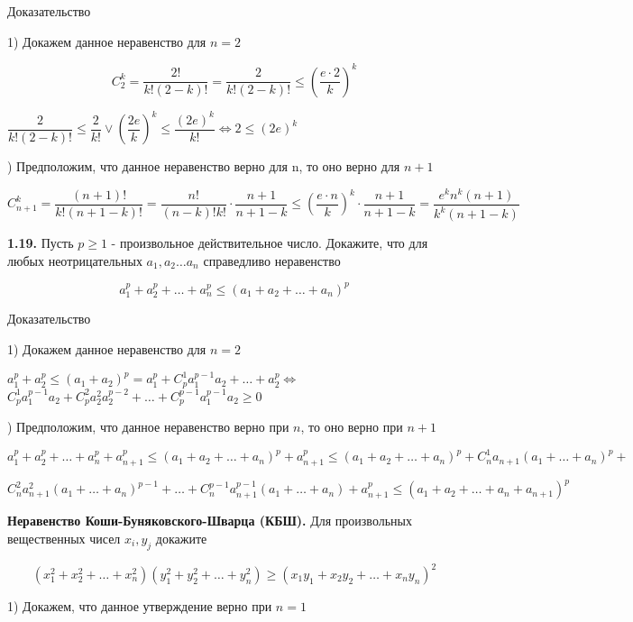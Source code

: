 \documentclass[12pt]{article}
\begin{document}
	\vspace{2mm}
	Доказательство
	
	1) Докажем данное неравенство для $n=2$\medskip
	
	\[
		C_2^k = \dfrac{2!}{k!(2-k)!} = \dfrac{2}{k!(2-k)!} \le \left(\dfrac{e\cdot2}{k}\right)^k 
	\]
	
	\qquad$\dfrac{2}{k!(2-k)!} \le \dfrac{2}{k!} \vee \left(\dfrac{2e}{k}\right)^k \le \dfrac{(2e)^k}{k!}$\quad$\Longleftrightarrow$\quad $2\le (2e)^k$ 
	
	) Предположим, что данное неравенство верно для n, то оно верно для $n+1$\medskip
	
	\qquad$
	C_{n+1}^k = \dfrac{(n+1)!}{k!(n+1-k)!} = \dfrac{n!}{(n-k)!k!}\cdot\dfrac{n+1}{n+1-k}\le \left(\dfrac{e\cdot n}{k}\right)^k\cdot\dfrac{n+1}{n+1-k} = \dfrac{e^k n^k(n+1)}{k^k(n+1-k)}
	$
	
	\medskip
	{\bf1.19.} \textasteriskcentered\hspace{1mm} Пусть $p\ge1$ - произвольное действительное число. Докажите, что для любых неотрицательных $a_1,a_2\dots a_n$ справедливо неравенство
	
	\[
		a_1^p+a_2^p+\dots+a_n^p \le (a_1+a_2+\dots+a_n)^p
	\]
	
	Доказательство 
	
	\medskip
	
	1) Докажем данное неравенство для $n=2$\medskip
	
	$a_1^p+a_2^p \le (a_1+a_2)^p = a_1^p+ C_p^1a_1^{p-1}a_2+\dots+ a_2^p$\quad$\Longleftrightarrow$\quad $C_p^1a_1^{p-1}a_2+C_p^2a_2^2a_2^{p-2}+\dots+C_p^{p-1}a_1^{p-1}a_2\ge 0$
	
	) Предположим, что данное неравенство верно при $n$, то оно верно при $n+1$\medskip
	
	$
		a_1^p+a_2^p+\dots+a_n^p + a_{n+1}^p \le (a_1+a_2+\dots+a_n)^p + a_{n+1}^p \le (a_1+a_2+\dots+a_n)^p+C_n^1 a_{n+1}(a_1+\dots+a_n)^p+
	$
	
	$
	C_n^2 a_{n+1}^2(a_1+\dots+a_n)^{p-1}+\dots+ C_n^{p-1}a_{n+1}^{p-1}(a_1+\dots+a_n)+a_{n+1}^p\le (a_1+a_2+\dots+a_n+a_{n+1})^p
	$
	
	\medskip
	\newpage
	
	{\bf Неравенство Коши-Буняковского-Шварца (КБШ).} Для произвольных вещественных чисел $x_i, y_j$ докажите
	
	\[
		(x_1^2+x_2^2+\dots+x_n^2)(y_1^2+y_2^2+\dots+y_n^2) \ge (x_1y_1+x_2y_2+\dots+x_ny_n)^2
	\]
	
	1) Докажем, что данное утверждение верно при $n=1$
	\medskip
	
\end{document}

